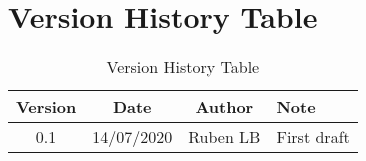 \section{Version History Table}

\begin{table}[h]
	\centering
	\begin{tabular}{|c|c|c|l|}
		\hline
		Version & Date       & Author     & Note                                \\ \hline
		0.1     & 14/07/2020 & Ruben LB   & First draft                         \\ \hline
	\end{tabular}
	\caption{Version History Table}
	\label{tab:version-table}
\end{table}
